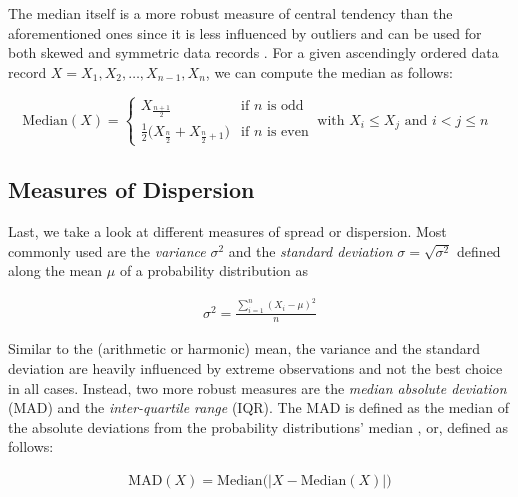 The median itself is a more robust measure of central tendency than the
aforementioned ones since it is less influenced by outliers and can be used for
both skewed and symmetric data records \citep{shanmugam_statistics_2015}. For a
given ascendingly ordered data record $X = X_1, X_2, \ldots, X_{n-1}, X_n$, we
can compute the median as follows:

\begin{equation} \label{eq:median}
\mathrm{Median}(X) = \begin{cases}
     X_{\frac{n+1}{2}} & \text{if $n$ is odd} \\
     \frac{1}{2}\big(X_{\frac{n}{2}} + X_{\frac{n}{2}+1}\big) & \text{if $n$ is
     even}
   \end{cases}~\text{with $X_i \leq X_j$ and $i < j \leq n$ }
\end{equation}

\subsection{Measures of Dispersion}

Last, we take a look at different measures of spread or dispersion. Most
commonly used are the \emph{variance} $\sigma^2$ and the \emph{standard
deviation} $\sigma = \sqrt{\sigma^2}$ defined along the mean $\mu$ of a
probability distribution as

\begin{equation} \label{eq:variance}
\begin{split}
\sigma^2 = \frac{\sum_{i=1}^{n}(X_i - \mu)^2}{n}
\end{split}
\end{equation}

Similar to the (arithmetic or harmonic) mean, the variance and the standard
deviation are heavily influenced by extreme observations
\citep{shanmugam_statistics_2015} and not the best choice in all cases. Instead,
two more robust measures are the \emph{median absolute deviation} (MAD) and the \emph{inter-quartile range} (IQR). The MAD is defined as the median of the absolute deviations from the probability distributions'
median \citep{molyneaux_art_2014}, or, defined as follows:

\begin{equation} \label{eq:mad}
\begin{split}
\mathrm{MAD}(X) = \mathrm{Median}\big(|X - \mathrm{Median}(X)|\big)
\end{split}
\end{equation}
 
